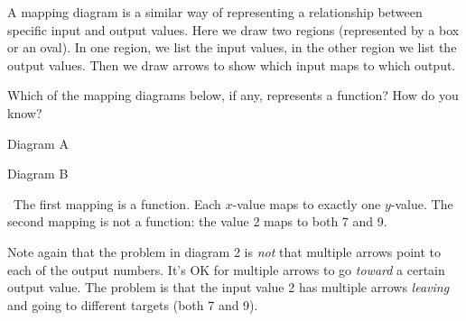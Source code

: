 A \gls{mapping diagram} is a similar way of representing a relationship between specific input and output values. Here we draw two regions (represented by a box or an oval). In one region, we list the input values, in the other region we list the output values. Then we draw arrows to show which input maps to which output.

\begin{boxedex}
Which of the mapping diagrams below, if any, represents a function? How do you know?

\begin{minipage}{0.5\textwidth}
\centering
Diagram A
\par{}
\end{minipage}
\begin{minipage}{0.5\textwidth}
\centering
Diagram B
\par{}
\end{minipage}

\exsoln\ The first mapping is a function. Each $x$-value maps to exactly one $y$-value. The second mapping is not a function: the value 2 maps to both 7 and 9.
\end{boxedex}

Note again that the problem in diagram 2 is \textit{not} that multiple arrows point to each of the output numbers. It's OK for multiple arrows to go \textit{toward} a certain output value. The problem is that the input value 2 has multiple arrows \textit{leaving} and going to different targets (both 7 and 9).

